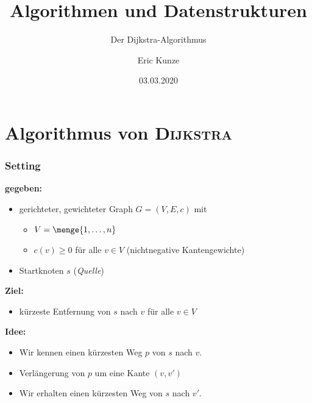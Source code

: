 \documentclass{beamer}
\newcommand{\person}[1]{\textsc{#1}}
\begin{document}
	
	\title{Algorithmen und Datenstrukturen}
	\subtitle{Der Dijkstra-Algorithmus}
	\author{Eric Kunze}
	\date{03.03.2020}

	\maketitle


\section{Algorithmus von \person{Dijkstra}}

\begin{frame} \frametitle{Setting \cite{vogler}}
	\textbf{gegeben:} 
	\begin{itemize}
		\item gerichteter, gewichteter Graph $G = (V,E,c)$ mit
		\begin{itemize}
			\item $V = \menge{1, \dots, n}$ 
			\item $c(v) \ge 0$ für alle $v \in V$ (nichtnegative Kantengewichte)
		\end{itemize}
		\item Startknoten $s$ (\textit{Quelle})
	\end{itemize}
	\textbf{Ziel:} 
		\begin{itemize}
			\item kürzeste Entfernung von $s$ nach $v$ für alle $v \in V$ 
		\end{itemize}
	\textbf{Idee:}
		\begin{itemize}
			\item Wir kennen einen kürzesten Weg $p$ von $s$ nach $v$.
			\item Verlängerung von $p$ um eine Kante $(v,v')$
			\item Wir erhalten einen kürzesten Weg von $s$ nach $v'$.
		\end{itemize}
\end{frame}
\end{document}
